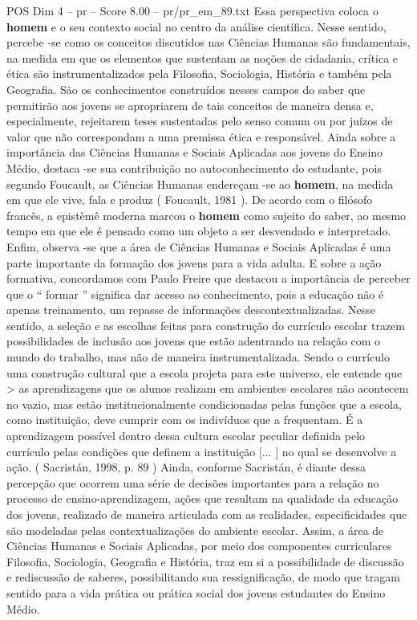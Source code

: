\begin{textsample}{POS Dim 4 – pr – Score 8.00 – pr/pr\_em\_89.txt}
Essa perspectiva coloca o \textbf{homem} e o seu contexto social no centro da análise científica.
Nesse sentido, percebe -se como os conceitos discutidos nas Ciências Humanas são fundamentais, na medida em que os elementos que sustentam as noções de cidadania, crítica e ética são instrumentalizados pela Filosofia, Sociologia, História e também pela Geografia.
São os conhecimentos construídos nesses campos do saber que permitirão aos jovens se apropriarem de tais conceitos de maneira densa e, especialmente, rejeitarem teses sustentadas pelo senso comum ou por juízos de valor que não correspondam a uma premissa ética e responsável.
Ainda sobre a importância das Ciências Humanas e Sociais Aplicadas aos jovens do Ensino Médio, destaca -se sua contribuição no autoconhecimento do estudante, pois segundo Foucault, as Ciências Humanas endereçam -se ao \textbf{homem}, na medida em que ele vive, fala e produz ( Foucault, 1981 ).
De acordo com o filósofo francês, a epistèmê moderna marcou o \textbf{homem} como sujeito do saber, ao mesmo tempo em que ele é pensado como um objeto a ser desvendado e interpretado.
Enfim, observa -se que a área de Ciências Humanas e Sociais Aplicadas é uma parte importante da formação dos jovens para a vida adulta.
E sobre a ação formativa, concordamos com Paulo Freire que destacou a importância de perceber que o “ formar ” significa dar acesso ao conhecimento, pois a educação não é apenas treinamento, um repasse de informações descontextualizadas.
Nesse sentido, a seleção e as escolhas feitas para construção do currículo escolar trazem possibilidades de inclusão aos jovens que estão adentrando na relação com o mundo do trabalho, mas não de maneira instrumentalizada.
Sendo o currículo uma construção cultural que a escola projeta para este universo, ele entende que > as aprendizagens que os alunos realizam em ambientes escolares não acontecem no vazio, mas estão institucionalmente condicionadas pelas funções que a escola, como instituição, deve cumprir com os indivíduos que a frequentam.
É a aprendizagem possível dentro dessa cultura escolar peculiar definida pelo currículo pelas condições que definem a instituição [... ] no qual se desenvolve a ação. ( Sacristán, 1998, p. 89 ) Ainda, conforme Sacristán, é diante dessa percepção que ocorrem uma série de decisões importantes para a relação no processo de ensino-aprendizagem, ações que resultam na qualidade da educação dos jovens, realizado de maneira articulada com as realidades, especificidades que são modeladas pelas contextualizações do ambiente escolar.
Assim, a área de Ciências Humanas e Sociais Aplicadas, por meio dos componentes curriculares Filosofia, Sociologia, Geografia e História, traz em si a possibilidade de discussão e rediscussão de saberes, possibilitando sua ressignificação, de modo que tragam sentido para a vida prática ou prática social dos jovens estudantes do Ensino Médio.

\end{textsample}

